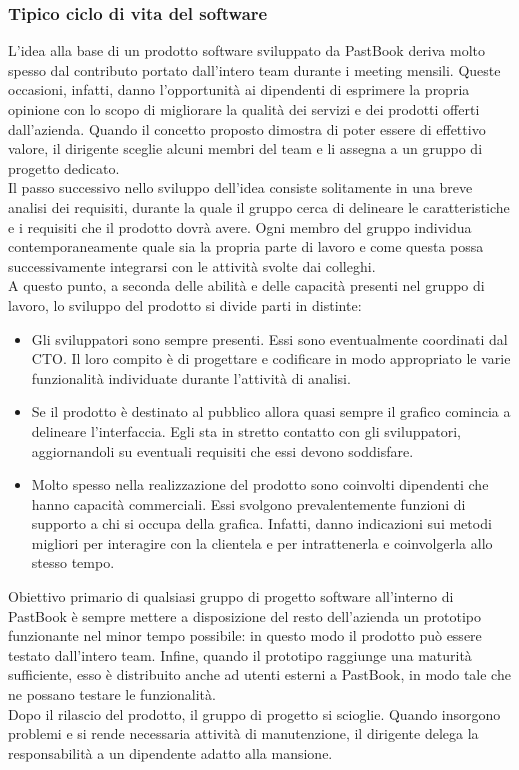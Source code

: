 			\subsubsection{Tipico ciclo di vita del software}
				L'idea alla base di un prodotto software sviluppato da PastBook deriva molto spesso dal contributo portato
				dall'intero team durante i meeting mensili. Queste occasioni, infatti, danno l'opportunità ai dipendenti di esprimere
				la propria opinione con lo scopo di migliorare la qualità dei servizi e dei prodotti offerti dall'azienda. Quando il
				concetto proposto dimostra di poter essere di effettivo valore, il dirigente sceglie alcuni membri del team e li
				assegna a un gruppo di progetto dedicato.\\
				Il passo successivo nello sviluppo dell'idea consiste solitamente in una breve analisi dei requisiti, durante la
				quale il gruppo cerca di delineare le caratteristiche e i requisiti che il prodotto dovrà avere. Ogni membro del
				gruppo individua contemporaneamente quale sia la propria parte di lavoro e come questa possa successivamente
				integrarsi con le attività svolte dai colleghi.\\
				A questo punto, a seconda delle abilità e delle capacità presenti nel gruppo di lavoro, lo sviluppo del prodotto
				si divide parti in distinte:
				\begin{itemize}
					\item Gli sviluppatori sono sempre presenti. Essi sono eventualmente coordinati dal CTO. Il loro compito è
					di progettare e codificare in modo appropriato le varie funzionalità individuate durante l'attività di
					analisi.
					\item Se il prodotto è destinato al pubblico allora quasi sempre il grafico comincia a delineare
					l'interfaccia. Egli sta in stretto contatto con gli sviluppatori, aggiornandoli su eventuali requisiti
					che essi devono soddisfare.
					\item Molto spesso nella realizzazione del prodotto sono coinvolti dipendenti che hanno capacità commerciali.
					Essi svolgono prevalentemente funzioni di supporto a chi si occupa della grafica. Infatti, danno indicazioni
					sui metodi migliori per interagire con la clientela e per intrattenerla e coinvolgerla allo stesso tempo.
				\end{itemize}
				Obiettivo primario di qualsiasi gruppo di progetto software all'interno di PastBook è sempre mettere a
				disposizione del resto dell'azienda un prototipo funzionante nel minor tempo possibile: in questo modo il prodotto può
				essere testato dall'intero team. Infine, quando il prototipo raggiunge una maturità sufficiente, esso è distribuito
				anche ad utenti esterni a PastBook, in modo tale che ne possano testare le funzionalità.\\
				Dopo il rilascio del prodotto, il gruppo di progetto si scioglie. Quando insorgono problemi e si rende necessaria
				attività di manutenzione, il dirigente delega la responsabilità a un dipendente adatto alla mansione.
				
